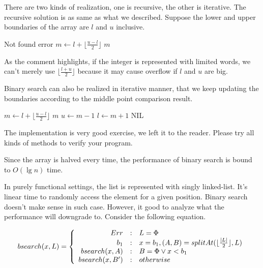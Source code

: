 \documentclass[UTF8]{article}
\begin{document}
There are two kinds of realization, one is recursive, the other is iterative. The recursive solution
is as same as what we described. Suppose the lower and upper boundaries of the array
are $l$ and $u$ inclusive.

\begin{algorithmic}[1]
    \State Not found error
  \Else
     \State $m \gets l + \lfloor \frac{u - l}{2} \rfloor$ 
       \State \Return $m$
     \EndIf
       \State \Return {}
     \Else
       \State \Return {}
     \EndIf
  \EndIf
\EndFunction
\end{algorithmic}

As the comment highlights, if the integer is represented with limited words, we can't merely use $\lfloor \frac{l+u}{2} \rfloor$
because it may cause overflow if $l$ and $u$ are big.

Binary search can also be realized in iterative manner, that we keep updating the boundaries according to the middle point
comparison result.

\begin{algorithmic}[1]
    \State $m \gets l + \lfloor \frac{u - l}{2} \rfloor$
      \State \Return $m$
    \EndIf
      \State $u \gets m - 1$
    \Else
      \State $l \gets m + 1$
    \EndIf
  \EndWhile
  \Return NIL
\EndFunction
\end{algorithmic}

The implementation is very good exercise, we left it to the reader. Please try all kinds of methods to verify your program.

Since the array is halved every time, the performance of binary search is bound to $O(\lg n)$ time.

In purely functional settings, the list is represented with singly linked-list. It's linear time to randomly access the
element for a given position. Binary search doesn't make sense in such case. However, it good to analyze what the performance
will downgrade to. Consider the following equation.

\[
bsearch(x, L) = \left \{
  \begin{array}
  {r@{\quad:\quad}l}
  Err & L = \Phi \\
  b_1 & x = b_1, (A, B) = splitAt(\lfloor \frac{|L|}{2} \rfloor, L) \\
  bsearch(x, A) & B = \Phi \lor x < b_1 \\
  bsearch(x, B') & otherwise
  \end{array}
\right.
\]
\end{document}

